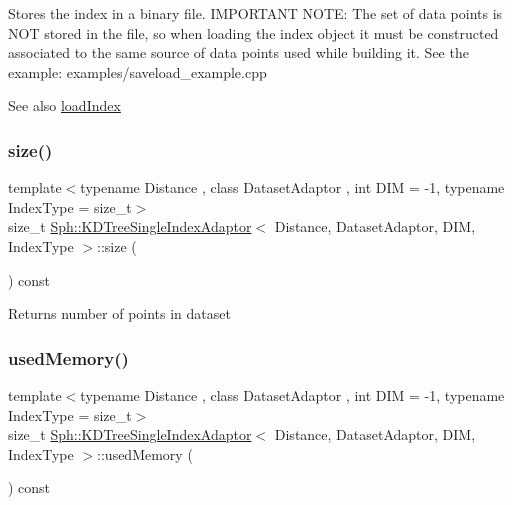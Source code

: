 Stores the index in a binary file. I\+M\+P\+O\+R\+T\+A\+NT N\+O\+TE\+: The set of data points is N\+OT stored in the file, so when loading the index object it must be constructed associated to the same source of data points used while building it. See the example\+: examples/saveload\+\_\+example.\+cpp \begin{DoxySeeAlso}{See also}
\hyperlink{classSph_1_1KDTreeSingleIndexAdaptor_a0509f8a856bb3c6d278a182c5e6ce654}{load\+Index} 
\end{DoxySeeAlso}
\hypertarget{classSph_1_1KDTreeSingleIndexAdaptor_a48c011ca89a6a97693b7ba78e112d32c}{}\label{classSph_1_1KDTreeSingleIndexAdaptor_a48c011ca89a6a97693b7ba78e112d32c} 
\subsubsection{\texorpdfstring{size()}{size()}}
{\footnotesize\ttfamily template$<$typename Distance , class Dataset\+Adaptor , int D\+IM = -\/1, typename Index\+Type  = size\+\_\+t$>$ \\
size\+\_\+t \hyperlink{classSph_1_1KDTreeSingleIndexAdaptor}{Sph\+::\+K\+D\+Tree\+Single\+Index\+Adaptor}$<$ Distance, Dataset\+Adaptor, D\+IM, Index\+Type $>$\+::size (\begin{DoxyParamCaption}{ }\end{DoxyParamCaption}) const\hspace{0.3cm}{\ttfamily [inline]}}

Returns number of points in dataset \hypertarget{classSph_1_1KDTreeSingleIndexAdaptor_a0f9d01c30153a3831103ba5381429e10}{}\label{classSph_1_1KDTreeSingleIndexAdaptor_a0f9d01c30153a3831103ba5381429e10} 
\subsubsection{\texorpdfstring{used\+Memory()}{usedMemory()}}
{\footnotesize\ttfamily template$<$typename Distance , class Dataset\+Adaptor , int D\+IM = -\/1, typename Index\+Type  = size\+\_\+t$>$ \\
size\+\_\+t \hyperlink{classSph_1_1KDTreeSingleIndexAdaptor}{Sph\+::\+K\+D\+Tree\+Single\+Index\+Adaptor}$<$ Distance, Dataset\+Adaptor, D\+IM, Index\+Type $>$\+::used\+Memory (\begin{DoxyParamCaption}{ }\end{DoxyParamCaption}) const\hspace{0.3cm}{\ttfamily [inline]}}

